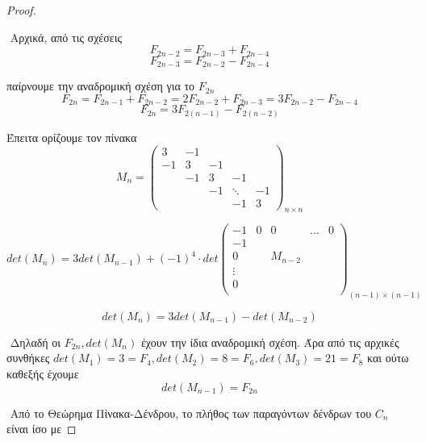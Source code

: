 \documentclass[oneside,a4paper]{article}
\begin{document}
\begin{proof} $ $

	$ $\newline
	Αρχικά, από τις σχέσεις 
	$$F_{2n-2} = F_{2n-3} + F_{2n-4}$$
	$$F_{2n-3} = F_{2n-2} - F_{2n-4}$$
	
	
	\noindent παίρνουμε την αναδρομική σχέση για το $F_{2n}$
	$$F_{2n} = F_{2n-1} + F_{2n-2} = 2F_{2n-2} + F_{2n-3} = 3F_{2n-2} - F_{2n-4}$$
	$$F_{2n} = 3F_{2(n-1)} - F_{2(n-2)}$$

	\noindent Έπειτα ορίζουμε τον πίνακα
	$$M_n = \begin{pmatrix}
		3 & -1 &  &  & \\
		-1 & 3 & -1 &  &  \\
		& -1 & 3 & -1 &  \\
		& & -1 & \ddots & -1\\
		& & & -1& 3
	\end{pmatrix}_{n\times n}$$

	$$det(M_n) = 3 det(M_{n-1}) + (-1)^4 \cdot det \begin{pmatrix}
		-1 & 0 & 0 & \ldots & 0 \\
		-1 & & & & \\
		0 & & M_{n-2} & & \\
		\vdots & & & & \\
		0 & & & & \\
	\end{pmatrix}_{(n-1)\times (n-1)}$$

	$$det(M_n) = 3det(M_{n-1}) - det(M_{n-2})$$

	$ $\newline
	Δηλαδή οι $F_{2n}, det(M_n)$ έχουν την ίδια αναδρομική σχέση. Άρα από τις αρχικές συνθήκες $det(M_1) = 3 = F_4, det(M_2) = 8 = F_6, det(M_3) = 21 = F_8$  και ούτω καθεξής έχουμε
	$$det(M_{n-1}) = F_{2n}$$


	$ $\newline
	Από το Θεώρημα Πίνακα-Δένδρου, το πλήθος των παραγόντων δένδρων του $C_n$ είναι ίσο με 


\end{proof}
\end{document}
